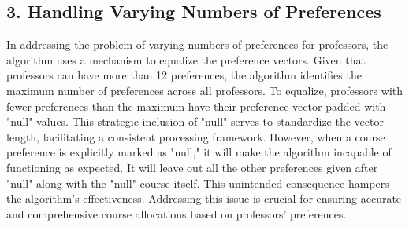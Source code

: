 \documentclass{article}
\begin{document}
\subsection*{3. Handling Varying Numbers of Preferences}

In addressing the problem of varying numbers of preferences for professors, the algorithm uses a mechanism to equalize the preference vectors. Given that professors can have more than 12 preferences, the algorithm identifies the maximum number of preferences across all professors. To equalize, professors with fewer preferences than the maximum have their preference vector padded with "null" values. This strategic inclusion of "null" serves to standardize the vector length, facilitating a consistent processing framework. However, when a course preference is explicitly marked as "null," it will make the algorithm incapable of functioning as expected. It will leave out all the other preferences given after "null" along with the "null" course itself. This unintended consequence hampers the algorithm's effectiveness. Addressing this issue is crucial for ensuring accurate and comprehensive course allocations based on professors' preferences.
\end{document}
